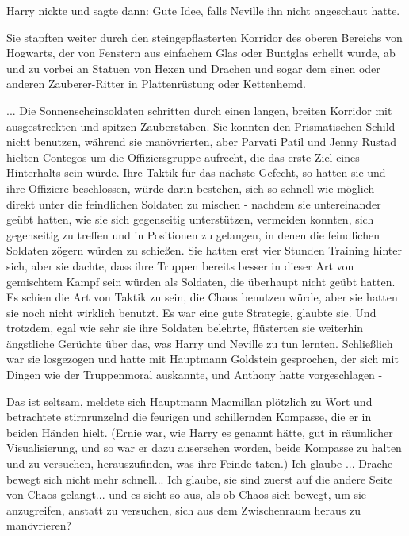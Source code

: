Harry nickte und sagte dann: \glqq{}Gute Idee\grqq{}, falls Neville ihn nicht
angeschaut hatte.

Sie stapften weiter durch den steingepflasterten Korridor des oberen Bereichs
von Hogwarts, der von Fenstern aus einfachem Glas oder Buntglas erhellt wurde,
ab und zu vorbei an Statuen von Hexen und Drachen und sogar dem einen oder
anderen Zauberer-Ritter in Plattenrüstung oder Kettenhemd.

... Die Sonnenscheinsoldaten schritten durch einen langen, breiten Korridor mit
ausgestreckten und spitzen Zauberstäben. Sie konnten den Prismatischen Schild
nicht benutzen, während sie manövrierten, aber Parvati Patil und Jenny Rustad
hielten Contegos um die Offiziersgruppe aufrecht, die das erste Ziel eines
Hinterhalts sein würde. Ihre Taktik für das nächste Gefecht, so hatten sie und
ihre Offiziere beschlossen, würde darin bestehen, sich so schnell wie möglich
direkt unter die feindlichen Soldaten zu mischen - nachdem sie untereinander
geübt hatten, wie sie sich gegenseitig unterstützen, vermeiden konnten, sich
gegenseitig zu treffen und in Positionen zu gelangen, in denen die feindlichen
Soldaten zögern würden zu schießen. Sie hatten erst vier Stunden Training hinter
sich, aber sie dachte, dass ihre Truppen bereits besser in dieser Art von
gemischtem Kampf sein würden als Soldaten, die überhaupt nicht geübt hatten. Es
schien die Art von Taktik zu sein, die Chaos benutzen würde, aber sie hatten sie
noch nicht wirklich benutzt. Es war eine gute Strategie, glaubte sie. Und
trotzdem, egal wie sehr sie ihre Soldaten belehrte, flüsterten sie weiterhin
ängstliche Gerüchte über das, was Harry und Neville zu tun lernten. Schließlich
war sie losgezogen und hatte mit Hauptmann Goldstein gesprochen, der sich mit
Dingen wie der Truppenmoral auskannte, und Anthony hatte vorgeschlagen -

\glqq{}Das ist seltsam\grqq{}, meldete sich Hauptmann Macmillan plötzlich zu Wort
und betrachtete stirnrunzelnd die feurigen und schillernden Kompasse, die er in
beiden Händen hielt. (Ernie war, wie Harry es genannt hätte, \glqq{}gut in
räumlicher Visualisierung\grqq{}, und so war er dazu ausersehen worden, beide
Kompasse zu halten und zu versuchen, herauszufinden, was ihre Feinde taten.)
\glqq{}Ich glaube ... Drache bewegt sich nicht mehr schnell... Ich glaube, sie
sind zuerst auf die andere Seite von Chaos gelangt... und es sieht so aus, als
ob Chaos sich bewegt, um sie anzugreifen, anstatt zu versuchen, sich aus dem
Zwischenraum heraus zu manövrieren?\grqq{}

